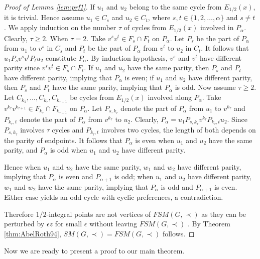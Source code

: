 \documentclass[11pt]{article}
\numberwithin{theorem}{section}
\begin{document}
\begin{proof}[Proof of Lemma \ref{lem:prf1}]
If $u_1$ and $u_2$ belong to the same cycle from $E_{1/2}(x)$, it is trivial. Hence assume $u_1\in C_s$ and $u_2\in C_t$, where $s,t\in \{1,2,\ldots,\alpha\}$ and $s\not=t$. We apply induction on the number $\tau$ of cycles from $E_{1/2}(x)$ involved in $P_\alpha$. Clearly, $\tau\geq 2$.
When $\tau=2$. Take $v^s v^t\in F_s\cap F_t$ on $P_\alpha$.
Let $P_s$ be the part of $P_\alpha$ from $u_1$ to $v^s$ in $C_s$ and $P_t$ be the part of $P_\alpha$ from $v^t$ to $u_2$ in $C_t$.
It follows that $u_1 P_s v^s v^t P_t u_2$ constitute $P_\alpha$.
By induction hypothesis, $v^s$ and $v^t$ have different parity since $v^s v^t\in F_s\cap F_t$.
If $u_1$ and $u_2$ have the same parity, then $P_s$ and $P_t$ have different parity, implying that $P_\alpha$ is even; if $u_1$ and $u_2$ have different parity, then $P_s$ and $P_t$ have the same parity, implying that $P_\alpha$ is odd.
Now assume $\tau\geq 2$. Let $C_{k_1},\ldots,C_{k_\tau},C_{k_{\tau+1}}$ be cycles from $E_{1/2}(x)$ involved along $P_\alpha$.
Take $v^{k_{\tau}} v^{k_{\tau+1}} \in F_{k_{\tau}}\cap F_{k_{\tau+1}}$ on $P_\alpha$.
Let $P_{s, k_{\tau}}$ denote the part of $P_\alpha$ from $u_1$ to $v^{k_{\tau}}$ and $P_{k_{\tau},t}$ denote the part of $P_\alpha$ from $v^{k_{\tau}}$ to $u_2$.
Clearly, $P_\alpha=u_1 P_{s,k_\tau} v^{k_\tau} P_{k_\tau, t} u_2$. Since $P_{s, k_{\tau}}$ involves $\tau$ cycles and $P_{k_{\tau},t}$ involves two cycles, the length of both depends on the parity of endpoints. It follows that $P_\alpha$ is even when $u_1$ and $u_2$ have the same parity, and $P_\alpha$ is odd when $u_1$ and $u_2$ have different parity.

Hence when $u_1$ and $u_2$ have the same parity, $w_1$ and $w_2$ have different parity, implying that $P_\alpha$ is even and $P_{\alpha+1}$ is odd;
when $u_1$ and $u_2$ have different parity, $w_1$ and $w_2$ have the same parity, implying that $P_\alpha$ is odd and $P_{\alpha+1}$ is even. 
Either case yields an odd cycle with cyclic preferences, a contradiction.

Therefore $1/2$-integral points are not vertices of $FSM(G,\prec)$ as they can be perturbed by $\epsilon z$ for small $\epsilon$ without leaving $FSM(G,\prec)$ . By Theorem \ref{thm:AbelRoth94}, $SM(G,\prec)=FSM(G,\prec)$ follows. 
\end{proof}

Now we are ready to present a proof to our main theorem.
\end{document}
